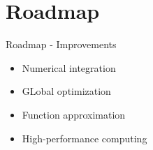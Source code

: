 \section{Roadmap}
\begin{frame}{Roadmap - Improvements
	}

\begin{itemize}\setlength\itemsep{1em}
\item Numerical integration
\item GLobal optimization
\item Function approximation
\item High-performance computing
\end{itemize}
\end{frame}
